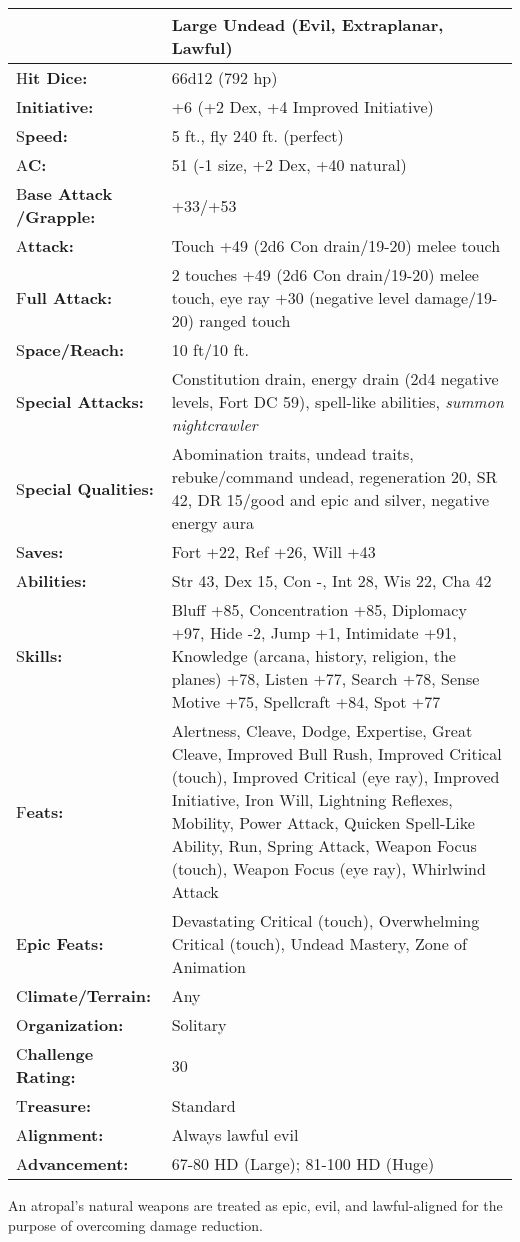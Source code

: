 \documentclass{article}
\begin{document}
\begin{tabular}{|>{\raggedright}p{67pt}|>{\raggedright}p{258pt}|}
\hline
 & Large Undead (Evil, Extraplanar, Lawful) \tabularnewline
\hline
H\textbf{it Dice:}  & 66d12 (792 hp) \tabularnewline
\hline
I\textbf{nitiative:}  & +6 (+2 Dex, +4 Improved Initiative) \tabularnewline
\hline
S\textbf{peed:}  & 5 ft., fly 240 ft. (perfect) \tabularnewline
\hline
A\textbf{C:}  & 51 (-1 size, +2 Dex, +40 natural) \tabularnewline
\hline
B\textbf{ase Attack /Grapple:} & +33/+53\tabularnewline
\hline
A\textbf{ttack:}  & Touch +49 (2d6 Con drain/19-20) melee touch\tabularnewline
\hline
F\textbf{ull Attack:}  & 2 touches +49 (2d6 Con drain/19-20) melee touch, eye ray 
+30 (negative level damage/19-20) ranged touch \tabularnewline
\hline
S\textbf{pace/Reach:}  & 10 ft/10 ft. \tabularnewline
\hline
S\textbf{pecial Attacks:}  & Constitution drain, energy drain (2d4 negative levels, 
Fort DC 59), spell-like abilities, \textit{summon nightcrawler }\tabularnewline
\hline
S\textbf{pecial Qualities:}  & Abomination traits, undead traits, rebuke/command 
undead, regeneration 20, SR 42, DR 15/good and epic and silver, negative energy 
aura \tabularnewline
\hline
S\textbf{aves:}  & Fort +22, Ref +26, Will +43 \tabularnewline
\hline
A\textbf{bilities:}  & Str 43, Dex 15, Con -, Int 28, Wis 22, Cha 42 \tabularnewline
\hline
S\textbf{kills:}  & Bluff +85, Concentration +85, Diplomacy +97, Hide -2, Jump 
+1, Intimidate +91, Knowledge (arcana, history, religion, the planes) +78, Listen 
+77, Search +78, Sense Motive +75, Spellcraft +84, Spot +77\tabularnewline
\hline
F\textbf{eats:}  & Alertness, Cleave, Dodge, Expertise, Great Cleave, Improved 
Bull Rush, Improved Critical (touch), Improved Critical (eye ray), Improved Initiative, 
Iron Will, Lightning Reflexes, Mobility, Power Attack, Quicken Spell-Like Ability, 
Run, Spring Attack, Weapon Focus (touch), Weapon Focus (eye ray), Whirlwind Attack 
\tabularnewline
\hline
E\textbf{pic Feats:}  & Devastating Critical (touch), Overwhelming Critical (touch), 
Undead Mastery, Zone of Animation \tabularnewline
\hline
C\textbf{limate/Terrain:}  & Any \tabularnewline
\hline
O\textbf{rganization:}  & Solitary \tabularnewline
\hline
C\textbf{hallenge Rating:}  & 30 \tabularnewline
\hline
T\textbf{reasure:}  & Standard \tabularnewline
\hline
A\textbf{lignment:}  & Always lawful evil \tabularnewline
\hline
A\textbf{dvancement:}  & 67-80 HD (Large); 81-100 HD (Huge) \tabularnewline
\hline
\end{tabular}

An atropal's natural weapons are treated as epic, evil, and lawful-aligned for 
the purpose of overcoming damage reduction.
\end{document}
